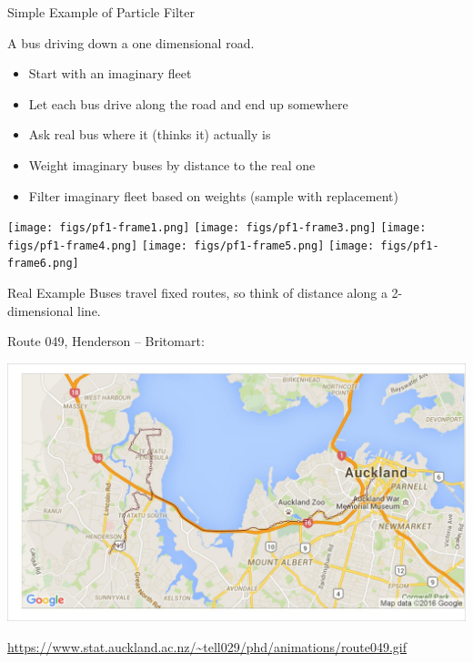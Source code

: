 \documentclass[10pt,t]{beamer}
\begin{document}
  
  


\begin{frame}{Simple Example of Particle Filter}

  A bus driving down a one dimensional road.
  \onslide<+->

  \begin{itemize}[<+- | alert@+>]
  \item Start with an imaginary fleet
  \item Let each bus drive along the road and end up somewhere
  \item Ask real bus where it (thinks it) actually is
  \item Weight imaginary buses by distance to the real one
  \item Filter imaginary fleet based on weights (sample with replacement)
  \end{itemize}
  
  \begin{overprint}
    \centering
    \texttt{[image: figs/pf1-frame1.png]}
    \centering
    \texttt{[image: figs/pf1-frame3.png]}
    \centering
    \texttt{[image: figs/pf1-frame4.png]}
    \centering
    \texttt{[image: figs/pf1-frame5.png]}
    \centering
    \texttt{[image: figs/pf1-frame6.png]}
  \end{overprint}

  \onslide<+->
\end{frame}


\begin{frame}{Real Example}
  Buses travel fixed routes, so think of distance along a 2-dimensional line.
  
  Route 049, Henderson -- Britomart:
  
  {\centering
  \includegraphics[width=\textwidth]{pf/particle_map001.jpg}}

  \footnotesize\url{https://www.stat.auckland.ac.nz/~tell029/phd/animations/route049.gif}
\end{frame}
\end{document}
